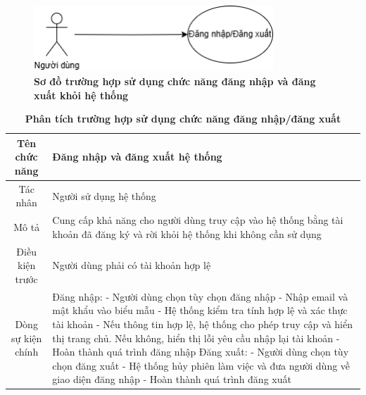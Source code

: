 \begin{figure}[H]
	\centering
	\includegraphics[width=9cm,height=2.5cm]{Images/use_case/use_case_login_logout.png}
	\caption[Sơ đồ trường hợp sử dụng chức năng đăng nhập và đăng xuất khỏi hệ thống]{\bfseries \fontsize{12pt}{0pt}
		\selectfont Sơ đồ trường hợp sử dụng chức năng đăng nhập và đăng xuất khỏi hệ thống}
	\label{use_case_login_logout} %
\end{figure}

\begin{table}[H]
	\caption{\bfseries \fontsize{12pt}{0pt}\selectfont Phân tích trường hợp sử dụng chức năng đăng nhập/đăng xuất}
	\centering
	\begin{tabularx}{0.9\textwidth}{|c|X|}
		\hline
		\textbf{Tên chức năng} & \textbf{Đăng nhập và đăng xuất hệ thống}                                                                                    \\
		\hline
		Tác nhân               & Người sử dụng hệ thống                                                                                                      \\
		\hline
		Mô tả                  & Cung cấp khả năng cho người dùng truy cập vào hệ thống bằng tài khoản đã đăng ký và rời khỏi hệ thống khi không cần sử dụng \\
		\hline
		Điều kiện trước        & Người dùng phải có tài khoản hợp lệ                                                                                         \\
		\hline
		Dòng sự kiện chính     &
		Đăng nhập: \newline
		- Người dùng chọn tùy chọn đăng nhập \newline
		- Nhập email và mật khẩu vào biểu mẫu \newline
		- Hệ thống kiểm tra tính hợp lệ và xác thực tài khoản \newline
		- Nếu thông tin hợp lệ, hệ thống cho phép truy cập và hiển thị trang chủ. Nếu không, hiển thị lỗi yêu cầu nhập lại tài khoản\newline
		- Hoàn thành quá trình đăng nhập \newline
		Đăng xuất: \newline
		- Người dùng chọn tùy chọn đăng xuất \newline
		- Hệ thống hủy phiên làm việc và đưa người dùng về giao diện đăng nhập  \newline
		- Hoàn thành quá trình đăng xuất                                                                                                                     \\
		\hline
	\end{tabularx}
\end{table}

